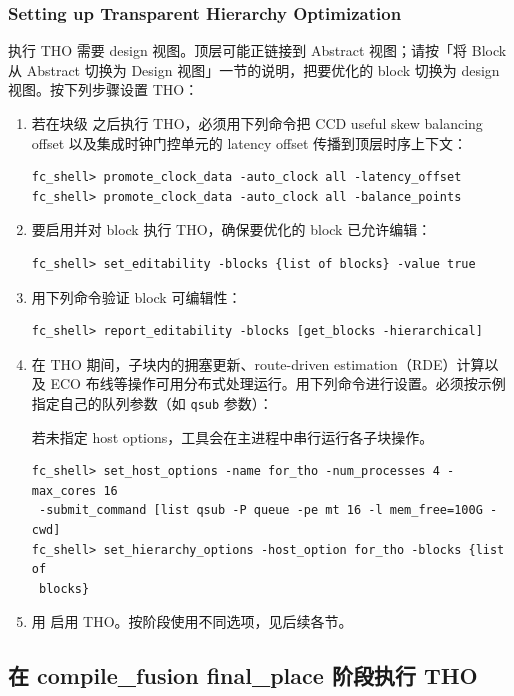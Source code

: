 \subsubsection*{Setting up Transparent Hierarchy Optimization}

执行 THO 需要 design 视图。顶层可能正链接到 Abstract 视图；请按「将 Block 从 Abstract 切换为 Design 视图」一节的说明，把要优化的 block 切换为 design 视图。按下列步骤设置 THO：
\begin{enumerate}
  \item 若在块级  之后执行 THO，必须用下列命令把 CCD useful skew balancing offset 以及集成时钟门控单元的 latency offset 传播到顶层时序上下文：
\begin{lstlisting}
fc_shell> promote_clock_data -auto_clock all -latency_offset
fc_shell> promote_clock_data -auto_clock all -balance_points
\end{lstlisting}
  \item 要启用并对 block 执行 THO，确保要优化的 block 已允许编辑：
\begin{lstlisting}
fc_shell> set_editability -blocks {list of blocks} -value true
\end{lstlisting}
  \item 用下列命令验证 block 可编辑性：
\begin{lstlisting}
fc_shell> report_editability -blocks [get_blocks -hierarchical]
\end{lstlisting}
  \item 在 THO 期间，子块内的拥塞更新、route-driven estimation（RDE）计算以及 ECO 布线等操作可用分布式处理运行。用下列命令进行设置。必须按示例指定自己的队列参数（如 \texttt{qsub} 参数）：
\begin{noteBox}
若未指定 host options，工具会在主进程中串行运行各子块操作。
\end{noteBox}
\begin{lstlisting}
fc_shell> set_host_options -name for_tho -num_processes 4 -max_cores 16
 -submit_command [list qsub -P queue -pe mt 16 -l mem_free=100G -cwd]
fc_shell> set_hierarchy_options -host_option for_tho -blocks {list of
 blocks}
\end{lstlisting}
  \item 用  启用 THO。按阶段使用不同选项，见后续各节。
\end{enumerate}

\subsection{在 compile\_fusion final\_place 阶段执行 THO}
